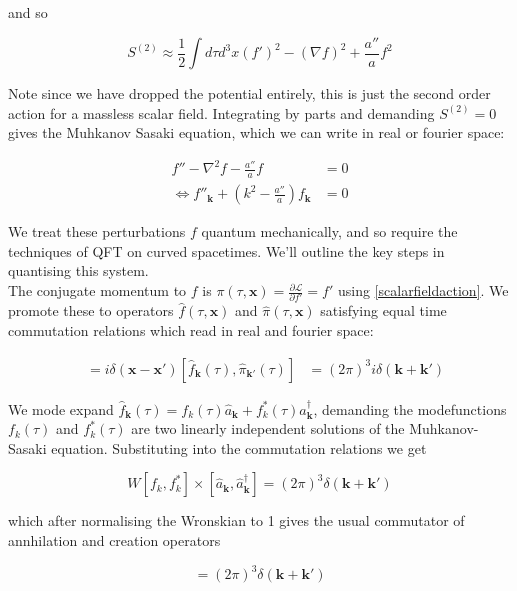 \documentclass[a4paper,11pt]{article}
\renewcommand{\v}[1]{\mathbf{#1}}
\newcommand{\half}{\frac{1}{2}}
\newcommand{\ann}[1]{\hat{a}_{\v{#1}}}
\newcommand{\cre}[1]{\hat{a}^\dagger_{\v{#1}}}
\begin{document}
and so 

\begin{equation}
S^{(2)} \approx \half \int d\tau d^3x (f')^2 - (\nabla f)^2 + \frac{a''}{a}f^2
\end{equation}

Note since we have dropped the potential entirely, this is just the second order action for a massless scalar field. Integrating by parts and demanding $S^{(2)}=0$ gives the Muhkanov Sasaki equation, which we can write in real or fourier space:

\begin{align}
f''-\nabla^2f-\frac{a''}{a}f &= 0 \\
\Leftrightarrow f''_{\v{k}} + (k^2-\frac{a''}{a})f_{\v{k}} &= 0
\label{MS}
\end{align}

We treat these perturbations $f$ quantum mechanically, and so require the techniques of QFT on curved spacetimes. We'll outline the key steps in quantising this system.\\

The conjugate momentum to $f$ is $\pi(\tau, \v{x}) =  \frac{\partial \mathcal{L}}{\partial f'} = f'$ using \ref{scalarfieldaction}. We promote these to operators $\hat{f}(\tau, \v{x})$ and $\hat{\pi}(\tau, \v{x})$ satisfying equal time commutation relations which read in real and fourier space:

\begin{align}
[\hat{f}(\tau, \v{x}), \hat{\pi}(\tau, \v{x'}] &= i\delta(\v{x}-\v{x'}) 
[\hat{f}_{\v{k}}(\tau), \hat{\pi}_{\v{k'}}(\tau)] &= (2\pi)^3i\delta(\v{k}+\v{k'})
\end{align}

We mode expand $\hat{f}_{\v{k}}(\tau) = f_k(\tau)\ann{k}+f_k^*(\tau)\cre{k}$, demanding the modefunctions $f_k(\tau)$ and $f_k^*(\tau)$ are two linearly independent solutions of the Muhkanov-Sasaki equation. Substituting into the commutation relations we get 

\begin{equation}
W[f_k,f_k^*]\times[\ann{k}, \cre{k}] = (2\pi)^3\delta(\v{k}+\v{k'})
\end{equation}

which after normalising the Wronskian to 1 gives the usual commutator of annhilation and creation operators

\begin{equation}
[\ann{k}, \cre{k}] = (2\pi)^3\delta(\v{k}+\v{k'})
\end{equation}
\end{document}
